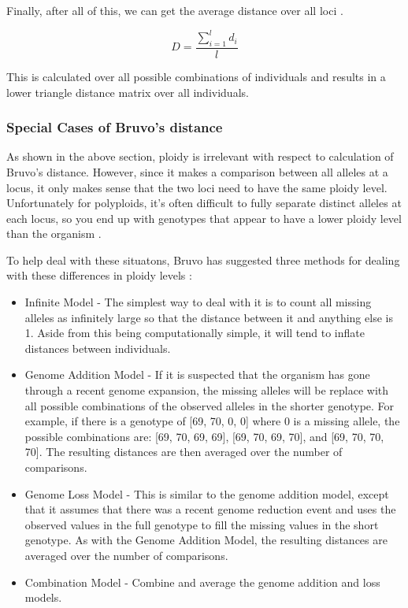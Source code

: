 \documentclass[letterpaper]{article}\usepackage[]{graphicx}\usepackage[]{color}
\newcommand{\tab}{\hspace*{1em}}
\begin{document}
Finally, after all of this, we can get the average distance over all loci \cite{Bruvo:2004}. 

\begin{equation}
\label{eq:D}
D = \frac{\displaystyle \sum_{i=1}^l d_i}{l}
\end{equation}

This is calculated over all possible combinations of individuals and results in a lower triangle distance matrix over all individuals. 

\subsubsection{Special Cases of Bruvo's distance}
\label{appendix:algorithm:bruvospecial}
\tab\tab As shown in the above section, ploidy is irrelevant with respect to calculation of Bruvo's distance. However, since it makes a comparison between all alleles at a locus, it only makes sense that the two loci need to have the same ploidy level. Unfortunately for polyploids, it's often difficult to fully separate distinct alleles at each locus, so you end up with genotypes that appear to have a lower ploidy level than the organism \cite{Bruvo:2004}. 

To help deal with these situatons, Bruvo has suggested three methods for dealing with these differences in ploidy levels \cite{Bruvo:2004}:
\begin{itemize}
  \item{Infinite Model -} The simplest way to deal with it is to count all missing alleles as infinitely large so that the distance between it and anything else is 1. Aside from this being computationally simple, it will tend to inflate distances between individuals. 
  \item{Genome Addition Model -} If it is suspected that the organism has gone through a recent genome expansion, the missing alleles will be replace with all possible combinations of the observed alleles in the shorter genotype. For example, if there is a genotype of [69, 70, 0, 0] where 0 is a missing allele, the possible combinations are: [69, 70, 69, 69], [69, 70, 69, 70], and [69, 70, 70, 70]. The resulting distances are then averaged over the number of comparisons. 
  \item{Genome Loss Model -} This is similar to the genome addition model, except that it assumes that there was a recent genome reduction event and uses the observed values in the full genotype to fill the missing values in the short genotype. As with the Genome Addition Model, the resulting distances are averaged over the number of comparisons.
  \item{Combination Model -} Combine and average the genome addition and loss models.
\end{itemize}
\end{document}
